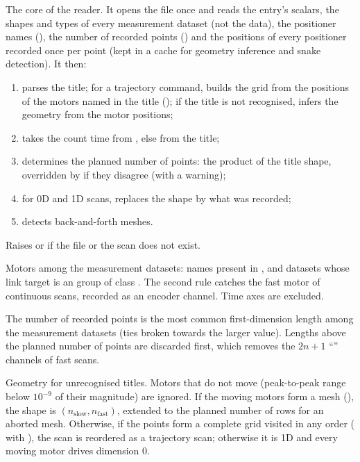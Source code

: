 The core of the reader. It opens the file once and reads the entry's scalars, the shapes and
types of every measurement dataset (not the data), the positioner names
(), the number of recorded points () and the
positions of every positioner recorded once per point (kept in a cache for geometry
inference and snake detection). It then:
\begin{enumerate}[nosep]
\item parses the title; for a trajectory command, builds the grid from the positions of the
  motors named in the title (); if the title is not recognised,
  infers the geometry from the motor positions;
\item takes the count time from , else from the title;
\item determines the planned number of points: the product of the title shape, overridden
  by  if they disagree (with a warning);
\item for 0D and 1D scans, replaces the shape by what was recorded;
\item detects back-and-forth meshes.
\end{enumerate}
Raises  or  if the file or the scan does not exist.

Motors among the measurement datasets: names present in , and datasets
whose link target is an  group of class . The second rule
catches the fast motor of continuous scans, recorded as an encoder channel. Time axes are
excluded.

The number of recorded points is the most common first-dimension length among the
measurement datasets (ties broken towards the larger value). Lengths above the planned number
of points are discarded first, which removes the $2n+1$ ``'' channels of fast
scans.

Geometry for unrecognised titles. Motors that do not move (peak-to-peak range below
$10^{-9}$ of their magnitude) are ignored. If the moving motors form a mesh
(), the shape is $(n_\mathrm{slow}, n_\mathrm{fast})$, extended to the planned
number of rows for an aborted mesh. Otherwise, if the points form a complete grid visited
in any order ( with ), the scan is reordered as a
trajectory scan; otherwise it is 1D and every moving motor drives dimension 0.

